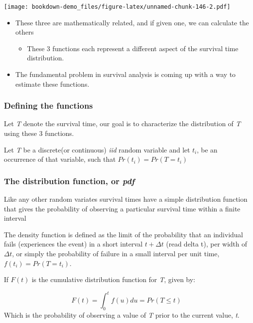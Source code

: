 \documentclass[
]{article}
\providecommand{\tightlist}{%
  \setlength{\itemsep}{0pt}\setlength{\parskip}{0pt}}
\begin{document}
\texttt{[image: bookdown-demo\_files/figure-latex/unnamed-chunk-146-2.pdf]}

\begin{itemize}
\tightlist
\item
  These three are mathematically related, and if given one, we can calculate the others

  \begin{itemize}
  \tightlist
  \item
    These 3 functions each represent a different aspect of the survival time distribution.
  \end{itemize}
\item
  The fundamental problem in survival analysis is coming up with a way to estimate these functions.
\end{itemize}

\hypertarget{defining-the-functions}{%
\subsubsection{Defining the functions}\label{defining-the-functions}}

Let \emph{T} denote the survival time, our goal is to characterize the distribution of \emph{T} using these 3 functions.

Let \emph{T} be a discrete(or continuous) \emph{iid} random variable and let \(t_i\), be an occurrence of that variable, such that \(Pr(t_i)=Pr(T=t_i)\)

\hypertarget{the-distribution-function-or-pdf}{%
\subsubsection{\texorpdfstring{The distribution function, or \emph{pdf}}{The distribution function, or pdf}}\label{the-distribution-function-or-pdf}}

Like any other random variates survival times have a simple distribution function that gives the probability of observing a particular survival time within a finite interval

The density function is defined as the limit of the probability that an individual fails (experiences the event) in a short interval \(t+\Delta t\) (read delta t), per width of \(\Delta t\), or simply the probability of failure in a small interval per unit time, \(f(t_i) = Pr(T=t_i)\).

If \(F(t)\) is the cumulative distribution function for \emph{T}, given by:

\[ F(t) = \int_{0}^{t} f(u) du = Pr(T \leqslant t )\]
Which is the probability of observing a value of \emph{T} prior to the current value, \emph{t}.
\end{document}
